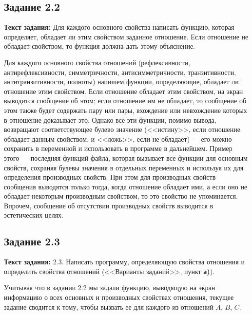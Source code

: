 \documentclass[12pt]{article}
\begin{document}
	\subsection{Задание 2.2}
	\label{subpart2_2}
	{\bf Текст задания:} Для каждого основного свойства написать функцию, которая определяет, обладает ли этим свойством заданное отношение. Если отношение не обладает свойством, то функция должна дать этому объяснение.
	
	Для каждого основного свойства отношений (рефлексивности, антирефлексивности, симметричности, антисимметричности, транзитивности, антитранзитивности, полноты) напишем функции, определяющие, обладает ли отношение этим свойством. Если отношение обладает этим свойством, на экран выводится сообщение об этом; если отношение им не обладает, то сообщение об этом также будет содержать пару или пары, вхождение или невхождение которых в отношение доказывает это. Однако все эти функции, помимо вывода, возвращают соответствующее булево значение (<<истину>>, если отношение обладает данным свойством, и <<ложь>>, если не обладает) --- его можно сохранить в переменной и использовать в программе в дальнейшем. Пример этого --- последняя функций файла, которая вызывает все функции для основным свойств, сохраняя булевы значения в отдельных переменных и используя их для определения производных свойств. При этом для производных свойств сообщения выводятся только тогда, когда отношение обладает ими, а если оно не обладает некоторым производным свойством, то это свойство не упоминается. Впрочем, сообщение об отсутствии производных свойств выводится в эстетических целях.
	
	
	
	\subsection{Задание 2.3}
	\label{subpart2_3}
	{\bf Текст задания:} 2.3. Написать программу, определяющую свойства отношения и определить свойства отношений (<<Варианты заданий>>, пункт {\bf а)}).
	
	Учитывая что в задании 2.2 мы задали функцию, выводящую на экран информацию о всех основных и производных свойствах отношения,  текущее задание сводится к тому, чтобы вызвать ее для каждого из отношений $A$, $B$, $C$.
	
	
	
	\begin{figure}[h]
		\noindent{}
		\end{figure}
	\newpage
\end{document}
